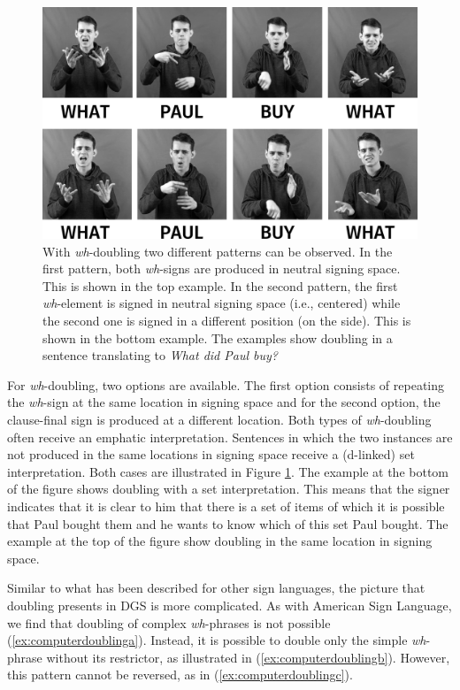 \begin{figure}[bt]
\centering
	\includegraphics[width=1.0\textwidth]{whdoublingsw.jpg}
	\caption{With \textit{wh}-doubling two different patterns can be observed. In the first pattern, both \textit{wh}-signs are produced in neutral signing space. This is shown in the top example. In the second pattern, the first \textit{wh}-element is signed in neutral signing space (i.e., centered) while the second one is signed in a different position (on the side). This is shown in the bottom example. The examples show doubling in a sentence translating to \textit{What did Paul buy?}}
	\label{whdoubling}
\end{figure}

For \textit{wh}-doubling, two options are available. The first option consists of repeating the \textit{wh}-sign at the same location in signing space and for the second option, the clause-final sign is produced at a different location. Both types of \textit{wh}-doubling often receive an emphatic interpretation. Sentences in which the two instances are not produced in the same locations in signing space receive a (d-linked) set interpretation. Both cases are illustrated in Figure \ref{whdoubling}. The example at the bottom of the figure shows doubling with a set interpretation. This means that the signer indicates that it is clear to him that there is a set of items of which it is possible that Paul bought them and he wants to know which of this set Paul bought. The example at the top of the figure show doubling in the same location in signing space. 

\largerpage
Similar to what has been described for other sign languages, the picture that doubling presents in DGS is more complicated. As with American Sign Language, we find that doubling of complex \textit{wh}-phrases is not possible (\ref{ex:computerdoublinga}). Instead, it is possible to double only the simple \textit{wh}-phrase without its restrictor, as illustrated in (\ref{ex:computerdoublingb}). However, this pattern cannot be reversed, as in (\ref{ex:computerdoublingc}).


